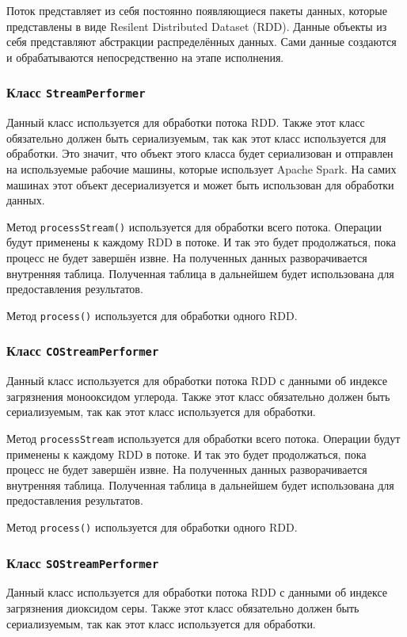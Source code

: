 Поток представляет из себя постоянно появляющиеся пакеты данных, которые представлены в виде Resilent Distributed Dataset (RDD).
Данные объекты из себя представляют абстракции распределённых данных.
Сами данные создаются и обрабатываются непосредственно на этапе исполнения.

\subsubsection{Класс \texttt{StreamPerformer}}
Данный класс используется для обработки потока RDD.
Также этот класс обязательно должен быть сериализуемым, так как этот класс используется для обработки.
Это значит, что объект этого класса будет сериализован и отправлен на используемые рабочие машины, которые использует Apache Spark.
На самих машинах этот объект десериализуется и может быть использован для обработки данных.

Метод \texttt{processStream()} используется для обработки всего потока.
Операции будут применены к каждому RDD в потоке.
И так это будет продолжаться, пока процесс не будет завершён извне.
На полученных данных разворачивается внутренняя таблица.
Полученная таблица в дальнейшем будет использована для предоставления результатов.

Метод \texttt{process()} используется для обработки одного RDD.


\subsubsection{Класс \texttt{COStreamPerformer}}
Данный класс используется для обработки потока RDD с данными об индексе загрязнения монооксидом углерода.
Также этот класс обязательно должен быть сериализуемым, так как этот класс используется для обработки.

Метод \texttt{processStream} используется для обработки всего потока.
Операции будут применены к каждому RDD в потоке.
И так это будет продолжаться, пока процесс не будет завершён извне.
На полученных данных разворачивается внутренняя таблица.
Полученная таблица в дальнейшем будет использована для предоставления результатов.

Метод \texttt{process()} используется для обработки одного RDD.


\subsubsection{Класс \texttt{SOStreamPerformer}}
Данный класс используется для обработки потока RDD с данными об индексе загрязнения диоксидом серы.
Также этот класс обязательно должен быть сериализуемым, так как этот класс используется для обработки.

